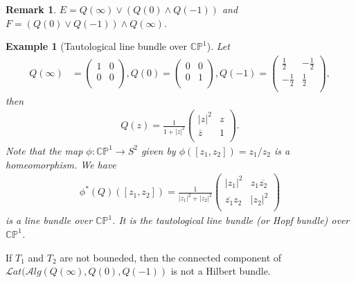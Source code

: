 \documentclass[a4paper,10pt]{amsart}
\newtheorem{example}{Example}[section]
\newtheorem{remark}{Remark}[section]
\newcommand{\Lat}{\mathcal Lat}
\newcommand{\Alg}{\mathcal Alg}
\newcommand{\C}{\mathbb C} %
\begin{document}
\begin{remark}
    $E = Q(\infty) \vee (Q(0) \wedge Q(-1))$ and 
    $F = (Q(0) \vee Q(-1)) \wedge Q(\infty)$.  
\end{remark}

\begin{example}[Tautological line bundle over $\C\mathbb{P}^1$]
Let
\begin{align*}
Q(\infty)&= \left(
        \begin{array}{cc}
          1 & 0 \\
          0 & 0 \\
        \end{array}
      \right),
Q(0)= \left(
        \begin{array}{cc}
          0 & 0 \\
          0 & 1 \\
        \end{array}
      \right),
Q(-1)= \left(
        \begin{array}{cc}
          \frac{1}{2} & -\frac{1}{2} \\
          -\frac{1}{2} & \frac{1}{2} \\
        \end{array}
      \right),
\end{align*}
then 
\begin{align*}
Q(z) = \frac{1}{1+|z|^2}
    \left(
        \begin{array}{cc}
          |z|^2 & z \\
        \overline{z} & 1\\
        \end{array}
      \right).  
\end{align*}
Note that the map $\phi: \C\mathbb{P}^1 \rightarrow S^{2}$ given by
$\phi([z_1, z_2]) = z_1/z_2$ is a homeomorphism. We have
\begin{align*}
\phi^{*}(Q)([z_1, z_2]) = \frac{1}{|z_1|^2+|z_2|^2}
    \left(
        \begin{array}{cc}
            |z_1|^2 & z_1 \overline{z_2} \\
        \overline{z_1}z_2 & |z_2|^2\\
        \end{array}
      \right) 
\end{align*}
is a line bundle over $\C\mathbb{P}^{1}$. 
It is the tautological line bundle (or Hopf bundle) over $\C\mathbb{P}^1$.
\end{example}

If $T_1$ and $T_2$ are not bouneded, then the connected 
component of $\Lat(\Alg(Q(\infty), Q(0), Q(-1))$ is not a Hilbert bundle.
\end{document}
